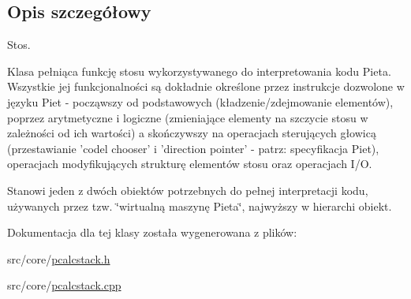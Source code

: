 \subsection{Opis szczegółowy}
Stos. 

Klasa pełniąca funkcję stosu wykorzystywanego do interpretowania kodu Pieta. Wszystkie jej funkcjonalności są dokładnie określone przez instrukcje dozwolone w języku Piet - począwszy od podstawowych (kładzenie/zdejmowanie elementów), poprzez arytmetyczne i logiczne (zmieniające elementy na szczycie stosu w zależności od ich wartości) a skończywszy na operacjach sterujących głowicą (przestawianie 'codel chooser' i 'direction pointer' - patrz: specyfikacja Piet), operacjach modyfikujących strukturę elementów stosu oraz operacjach I/O.

Stanowi jeden z dwóch obiektów potrzebnych do pełnej interpretacji kodu, używanych przez tzw. \char`\"{}wirtualną maszynę Pieta\char`\"{}, najwyższy w hierarchi obiekt. 

Dokumentacja dla tej klasy została wygenerowana z plików:\begin{CompactItemize}
\item 
src/core/\hyperlink{pcalcstack_8h}{pcalcstack.h}\item 
src/core/\hyperlink{pcalcstack_8cpp}{pcalcstack.cpp}\end{CompactItemize}

